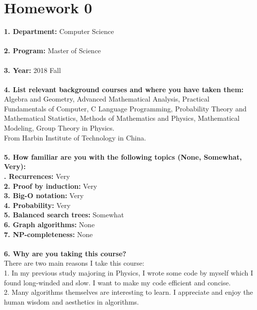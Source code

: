 \documentclass[twoside,11pt]{homework}
\date{\today} %
\begin{document}
\maketitle



\section*{Homework 0}
\textbf{1. Department:} Computer Science
\\\\
\textbf{2. Program:} Master of Science
\\\\
\textbf{3. Year:} 2018 Fall
\\\\
\textbf{4. List relevant background courses and where you have taken them:}
\\
Algebra and Geometry, Advanced Mathematical Analysis, Practical Fundamentals of Computer, C Language Programming, Probability Theory and Mathematical Statistics, Methods of Mathematics and Physics, Mathematical Modeling, Group Theory in Physics.
\\
From Harbin Institute of Technology in China.
\\\\
\textbf{5. How familiar are you with the following topics (None, Somewhat, Very):
\\
. Recurrences:} Very \\
\indent \textbf{2. Proof by induction:} Very \\
\indent  \textbf{3. Big-O notation:} Very \\
\indent  \textbf{4. Probability:} Very \\
\indent  \textbf{5. Balanced search trees:} Somewhat \\ 
\indent  \textbf{6. Graph algorithms:} None \\
\indent  \textbf{7. NP-completeness:} None
\\\\
\textbf{6. Why are you taking this course?}\\
There are two main reasons I take this course:\\
1. In my previous study majoring in Physics, I wrote some code by myself which I found long-winded and slow. I want to make my code efficient and concise.\\
2. Many algorithms themselves are interesting to learn. I appreciate and enjoy the  human wisdom and aesthetics in algorithms.
\end{document}
